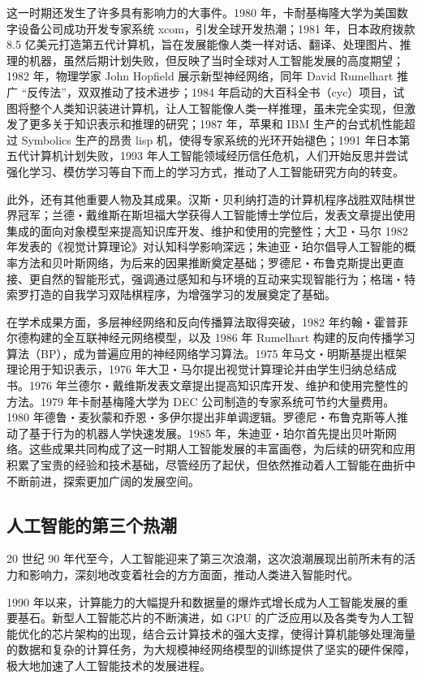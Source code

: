 这一时期还发生了许多具有影响力的大事件。1980 年，卡耐基梅隆大学为美国数字设备公司成功开发专家系统 xcom，引发全球开发热潮；1981 年，日本政府拨款 8.5 亿美元打造第五代计算机，旨在发展能像人类一样对话、翻译、处理图片、推理的机器，虽然后期计划失败，但反映了当时全球对人工智能发展的高度期望；1982 年，物理学家 John Hopfield 展示新型神经网络，同年 David Rumelhart 推广 “反传法”，双双推动了技术进步；1984 年启动的大百科全书（cyc）项目，试图将整个人类知识装进计算机，让人工智能像人类一样推理，虽未完全实现，但激发了更多关于知识表示和推理的研究；1987 年，苹果和 IBM 生产的台式机性能超过 Symbolics 生产的昂贵 lisp 机，使得专家系统的光环开始褪色；1991 年日本第五代计算机计划失败，1993 年人工智能领域经历信任危机，人们开始反思并尝试强化学习、模仿学习等自下而上的学习方式，推动了人工智能研究方向的转变。


此外，还有其他重要人物及其成果。汉斯・贝利纳打造的计算机程序战胜双陆棋世界冠军；兰德・戴维斯在斯坦福大学获得人工智能博士学位后，发表文章提出使用集成的面向对象模型来提高知识库开发、维护和使用的完整性；大卫・马尔 1982 年发表的《视觉计算理论》对认知科学影响深远；朱迪亚・珀尔倡导人工智能的概率方法和贝叶斯网络，为后来的因果推断奠定基础；罗德尼・布鲁克斯提出更直接、更自然的智能形式，强调通过感知和与环境的互动来实现智能行为；格瑞・特索罗打造的自我学习双陆棋程序，为增强学习的发展奠定了基础。


在学术成果方面，多层神经网络和反向传播算法取得突破，1982 年约翰・霍普菲尔德构建的全互联神经元网络模型，以及 1986 年 Rumelhart 构建的反向传播学习算法（BP），成为普遍应用的神经网络学习算法。1975 年马文・明斯基提出框架理论用于知识表示，1976 年大卫・马尔提出视觉计算理论并由学生归纳总结成书。1976 年兰德尔・戴维斯发表文章提出提高知识库开发、维护和使用完整性的方法。1979 年卡耐基梅隆大学为 DEC 公司制造的专家系统可节约大量费用。1980 年德鲁・麦狄蒙和乔恩・多伊尔提出非单调逻辑。罗德尼・布鲁克斯等人推动了基于行为的机器人学快速发展。1985 年，朱迪亚・珀尔首先提出贝叶斯网络。这些成果共同构成了这一时期人工智能发展的丰富画卷，为后续的研究和应用积累了宝贵的经验和技术基础，尽管经历了起伏，但依然推动着人工智能在曲折中不断前进，探索更加广阔的发展空间。


\subsection{人工智能的第三个热潮}


20 世纪 90 年代至今，人工智能迎来了第三次浪潮，这次浪潮展现出前所未有的活力和影响力，深刻地改变着社会的方方面面，推动人类进入智能时代。


1990 年以来，计算能力的大幅提升和数据量的爆炸式增长成为人工智能发展的重要基石。新型人工智能芯片的不断演进，如 GPU 的广泛应用以及各类专为人工智能优化的芯片架构的出现，结合云计算技术的强大支撑，使得计算机能够处理海量的数据和复杂的计算任务，为大规模神经网络模型的训练提供了坚实的硬件保障，极大地加速了人工智能技术的发展进程。


